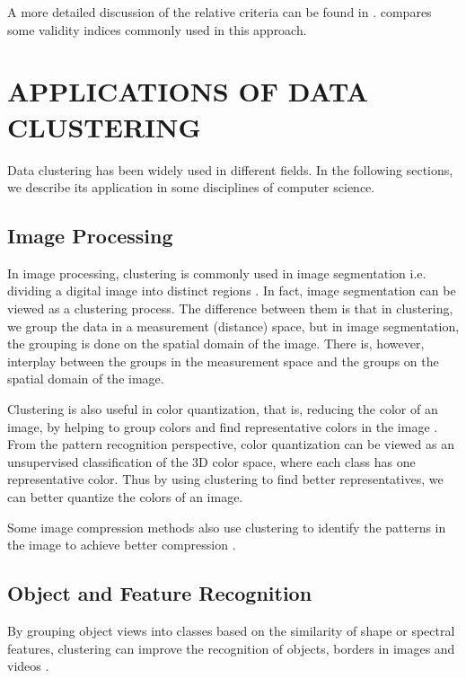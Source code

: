 \documentclass[conference]{IEEEtran}
\begin{document}
A more detailed discussion of the relative criteria can be found in \cite{Halkidi:2002:CVC:601858.601862}. \cite{bezdek1998some} compares some validity indices commonly used in this approach.

\section{APPLICATIONS OF DATA CLUSTERING} \label{sec:application}
Data clustering has been widely used in different fields. In the following sections, we describe its application in some disciplines of computer science.

\subsection{Image Processing}
In image processing, clustering is commonly used in image segmentation i.e. dividing a digital image into distinct regions \cite{haralick1985image}. In fact, image segmentation can be viewed as a clustering process. The difference between them is that in clustering, we group the data in a measurement (distance) space, but in image segmentation, the grouping is done
on the spatial domain of the image. There is, however, interplay between the groups in the measurement space and the groups on the spatial domain of the image.

Clustering is also useful in color quantization, that is, reducing the color of an image, by helping to group colors and find representative colors in the image \cite{scheunders1997comparison}. From the pattern recognition perspective, color quantization can be viewed as an unsupervised classification of the 3D color space, where each class has one representative color. Thus by using clustering to find better representatives, we can better quantize the colors of an image.

Some image compression methods also use clustering to identify the patterns in the image to achieve better compression \cite{jain1981image}.

\subsection{Object and Feature Recognition}
By grouping object views into classes based on the similarity of shape or spectral features, clustering can improve the recognition of objects, borders in images and videos \cite{lowe2004distinctive}.
\end{document}
